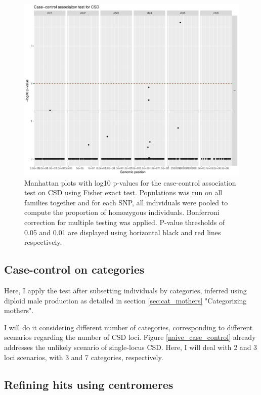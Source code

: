 \documentclass[10pt,a4paper]{report}
\begin{document}
\begin{figure}[h]
	\begin{center}
		\includegraphics[width=\textwidth]{association_mapping/fisher_bonferroni.pdf}
		\caption{Manhattan plots with log10 p-values for the case-control association test on CSD using Fisher exact test. Populations was run on all families together and for each SNP, all individuals were pooled to compute the proportion of homozygous individuals. Bonferroni correction for multiple testing was applied. P-value thresholds of 0.05 and 0.01 are displayed using horizontal black and red lines respectively.}
		\label{fisher_bonferroni}
	\end{center}
\end{figure}

\subsection{Case-control on categories}

Here, I apply the test after subsetting individuals by categories, inferred using diploid male production as detailed in section \ref{sec:cat_mothers} "Categorizing mothers". 

I will do it considering different number of categories, corresponding to different scenarios regarding the number of CSD loci. Figure \ref{naive_case_control} already addresses the unlikely scenario of single-locus CSD. Here, I will deal with 2 and 3 loci scenarios, with 3 and 7 categories, respectively.

\subsection{Refining hits using centromeres}
\end{document}
